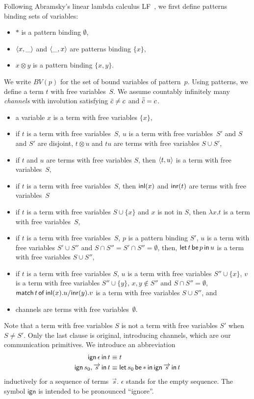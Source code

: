 Following Abramsky's linear lambda calculus
LF~\citep{abramsky1993computational}, we first define patterns
binding sets of variables:
\begin{itemize}
 \item $\ast$ is a pattern binding $\emptyset$,
 \item $\langle{x,\_}\rangle$ and $\langle{\_,x}\rangle$ are patterns binding $\{x\}$,
 \item $x\otimes y$ is a pattern binding $\{x,y\}$.
\end{itemize}
We write $BV(p)$ for the set of bound variables of pattern~$p$.
Using patterns, we define a term $t$ with free variables~$S$.
We assume countably infinitely many \textit{channels}
with involution satisfying $\bar{c}\neq c$ and $\bar{\bar{c}} = c$.
\begin{itemize}
 \item a variable $x$ is a term with free variables $\{x\}$,
 \item if $t$ is a term with free variables~$S$, $u$ is a term with
       free variables~$S'$ and $S$ and $S'$ are disjoint, $t\otimes u$ and
       $tu$ are terms with free variables $S\cup S'$,
 \item if $t$ and $u$ are terms with free variables $S$, then
       $\langle{t,u}\rangle$ is a term with free variables~$S$,
 \item if $t$ is a term with free variables~$S$, then
       $\mathsf{inl}({x})$ and $\mathsf{inr}({t})$ are terms with free variables~$S$
 \item if $t$ is a term with free variables $S\cup \{x\}$ and $x$ is not
       in $S$, then $\lambda x.t$ is a term with free variables~$S$,
 \item if $t$ is a term with free variables~$S$, $p$ is a pattern
       binding $S'$, $u$ is a term with free variables $S'\cup S''$ and
       $S\cap S'' = S'\cap S'' = \emptyset$, then,
       $\mathsf{let }\,{t}\,\mathsf{ be }\,{p}\,\mathsf{ in }\,{u}$ is a term with free variables $S\cup S''$,
 \item if $t$ is a term with free variables $S$,
       $u$ is a term with free variables $S''\cup \{x\}$,
       $v$ is a term with free variables $S''\cup \{y\}$,
       $x,y\notin S''$ and $S\cap S'' = \emptyset$,
       $\mathsf{match}\,{t}\,\mathsf{of}\, \mathsf{inl}({x}). {u}/ \mathsf{inr}({y}). {v}$ is a term with free variables $S\cup S''$, and
 \item channels are terms with free variables~$\emptyset$.
\end{itemize}
Note that a term with free variables $S$ is not a term with free
variables $S'$ when $S\neq S'$.  Only the last clause is original,
introducing channels, which are our communication primitives.
We introduce an abbreviation
\begin{align*}
 \mathsf{ign }\,{\epsilon}\,\mathsf{ in }\,{t}   & \equiv t\\
 \mathsf{ign }\,{s_0,\overrightarrow s}\,\mathsf{ in }\,{t} & \equiv \mathsf{let }\,{s_0}\,\mathsf{ be }\,{\ast}\,\mathsf{ in }\,{\mathsf{ign }\,{\overrightarrow s}\,\mathsf{ in }\,{t}}
\end{align*}
inductively for a sequence of terms~$\vec s$.
$\epsilon$ stands for the empty sequence.
The symbol $\mathsf{ign}$ is intended to be pronounced ``ignore''.

